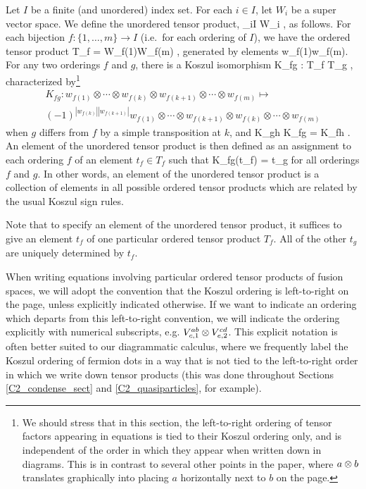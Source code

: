Let $I$ be a finite (and unordered) index set.
For each $i\in I$, let $W_i$ be a super vector space.
We define the unordered tensor product,
\be
	\bigotimes_{i\in I} W_i ,
\ee
as follows.
For each bijection $f: \{1, \ldots,m\} \to I$ (i.e.\ for each ordering of $I$),
we have the ordered tensor product
\be
	T_f = W_{f(1)}\otimes\cdots\otimes W_{f(m)} ,
\ee
generated by elements
\be
	w_{f(1)}\otimes\cdots\otimes w_{f(m)}.
\ee
For any two orderings $f$ and $g$, there is a Koszul isomorphism
\be
	K_{fg} : T_f \to T_g ,
\ee
characterized by\footnote{
We should stress that in this section, 
the left-to-right ordering of tensor factors appearing in equations is tied to their Koszul ordering only, and
is independent of the order in which they appear when written down in diagrams. 
This is in contrast to several other points in the 
paper, where $a\otimes b$ translates graphically into placing $a$ horizontally next to $b$ on the page.
} 
\begin{multline}
	K_{fg} : w_{f(1)}\otimes\cdots\otimes w_{f(k)} \otimes w_{f(k+1)} \otimes \cdots \otimes w_{f(m)} \mapsto \\
				(-1)^{|w_{f(k)}||w_{f(k+1)}|} w_{f(1)}\otimes\cdots\otimes w_{f(k+1)} \otimes w_{f(k)} \otimes \cdots \otimes w_{f(m)}
\end{multline}
when $g$ differs from $f$ by a simple transposition at $k$, and
\be
	K_{gh} \circ K_{fg} = K_{fh} .
\ee
An element of the unordered tensor product is then defined as an assignment to each ordering $f$ of an element $t_f\in T_f$
such that
\be
	K_{fg}(t_f) = t_g
\ee
for all orderings $f$ and $g$.
In other words, an element of the unordered tensor product is a collection of elements in all 
possible ordered tensor products which are related by the usual Koszul sign rules.


Note that to specify an element of the unordered tensor product, it suffices to give an element $t_f$ of one
particular ordered tensor product $T_f$.
All of the other $t_g$ are uniquely determined by $t_f$.

When writing equations involving particular ordered tensor products of fusion spaces, we will adopt the 
convention that the Koszul ordering is left-to-right on the page, unless explicitly 
indicated otherwise. If we want to indicate an ordering which departs from this left-to-right convention, 
we will indicate the ordering explicitly with numerical subscripts, 
e.g. $V^{ab}_{c,1} \otimes V^{cd}_{e,2}$.
This explicit notation is often better suited to our diagrammatic calculus, where 
we frequently label the Koszul ordering of fermion dots in a way that is not tied to the 
left-to-right order in which we write down tensor products (this was done throughout Sections
\ref{C2_condense_sect} and \ref{C2_quasiparticles}, for example). 

